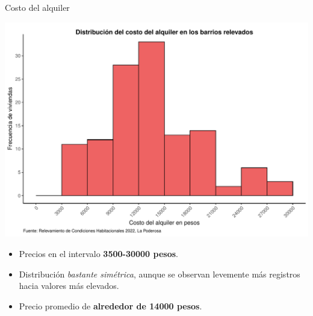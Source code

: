 \documentclass[aspectratio=169]{beamer}
\begin{document}
    \begin{frame}{Costo del alquiler}
        \begin{minipage}{.65\linewidth}
            \begin{overlayarea}{\linewidth}{.75\textheight}
                \includegraphics[height=.75\textheight]{graficas-pdf/histograma-costo-alquiler.pdf}
            \end{overlayarea}
        \end{minipage}
        \begin{minipage}{.34\linewidth}
            \small
            \setlength{\leftmargini}{8pt}
            \begin{itemize}
                \item<2-> Precios en el intervalo \textbf{3500-30000 pesos}.
                \item<3-> Distribución \textit{bastante simétrica}, aunque se observan levemente más registros hacia valores más elevados.
                \item<4-> Precio promedio de \textbf{alrededor de 14000 pesos}.

            \end{itemize}
        \end{minipage}
    \end{frame}
\end{document}
